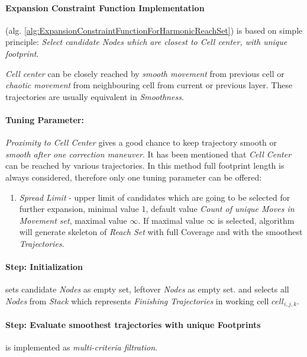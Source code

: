 \paragraph{Expansion Constraint Function Implementation} (alg. \ref{alg:ExpansionConstraintFunctionForHarmonicReachSet}) is based on simple principle: \emph{Select candidate Nodes  which are closest to Cell center, with unique footprint}.

\begin{note}
    \emph{Cell center} can be closely reached by \emph{smooth movement} from previous cell or \emph{chaotic movement} from neighbouring cell from current or previous layer. These trajectories are usually equivalent in \emph{Smoothness}.
\end{note}

\paragraph{Tuning Parameter:} \emph{Proximity to Cell Center} gives a good chance to keep trajectory smooth or \emph{smooth after one correction maneuver}. It has been mentioned that \emph{Cell Center} can be reached by various trajectories. In this method full footprint length is always considered, therefore only one tuning parameter can be offered:
\begin{enumerate}
    \item \emph{Spread Limit} - upper limit of candidates which are going to be selected for further expansion, minimal value 1, default value \emph{Count of unique Moves in Movement set}, maximal value $\infty$. If maximal value $\infty$ is selected, algorithm will generate skeleton of \emph{Reach Set} with full Coverage and with the smoothest \emph{Trajectories}.
\end{enumerate}

\paragraph{Step: Initialization} sets candidate \emph{Nodes} as empty set, leftover \emph{Nodes} as empty set. and selects all \emph{Nodes} from \emph{Stack} which represents  \emph{Finishing Trajectories} in working cell $cell_{i,j,k}$.

\paragraph{Step: Evaluate smoothest trajectories with unique Footprints} is implemented as \emph{multi-criteria filtration}. 

